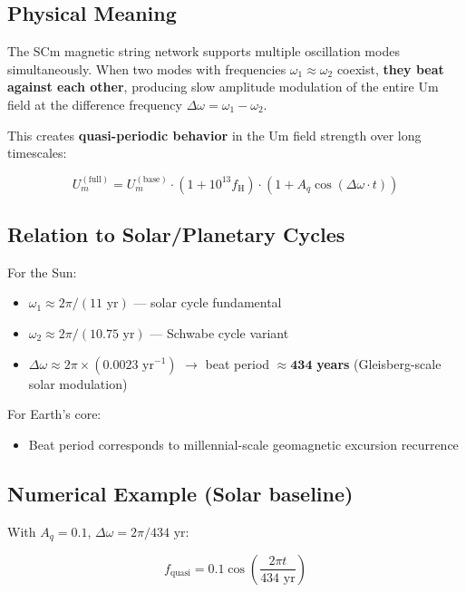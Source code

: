 \documentclass[12pt,a4paper]{article}
\begin{document}
\subsection{Physical Meaning}

The SCm magnetic string network supports multiple oscillation modes simultaneously. When two modes with frequencies $\omega_1 \approx \omega_2$ coexist, \textbf{they beat against each other}, producing slow amplitude modulation of the entire Um field at the difference frequency $\Delta\omega = \omega_1 - \omega_2$.

This creates \textbf{quasi-periodic behavior} in the Um field strength over long timescales:

\begin{equation}
U_m^{(\text{full})} = U_m^{(\text{base})} \cdot (1 + 10^{13} f_{\text{H}}) \cdot (1 + A_q \cos(\Delta\omega \cdot t))
\end{equation}

\subsection{Relation to Solar/Planetary Cycles}

For the Sun:

\begin{itemize}
  \item $\omega_1 \approx 2\pi / (11 \text{ yr})$ --- solar cycle fundamental
  \item $\omega_2 \approx 2\pi / (10.75 \text{ yr})$ --- Schwabe cycle variant
  \item $\Delta\omega \approx 2\pi \times (0.0023 \text{ yr}^{-1})$ $\to$ beat period $\approx \mathbf{434}$ \textbf{years} (Gleisberg-scale solar modulation)
\end{itemize}

For Earth's core:

\begin{itemize}
  \item Beat period corresponds to millennial-scale geomagnetic excursion recurrence
\end{itemize}

\subsection{Numerical Example (Solar baseline)}

With $A_q = 0.1$, $\Delta\omega = 2\pi / 434\text{ yr}$:

\begin{equation}
f_{\text{quasi}} = 0.1 \cos\!\left(\frac{2\pi t}{434 \text{ yr}}\right)
\end{equation}
\end{document}

